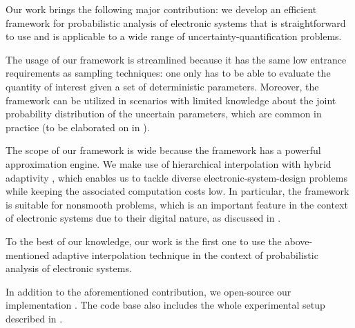 Our work brings the following major contribution: we develop an efficient
framework for probabilistic analysis of electronic systems that is
straightforward to use and is applicable to a wide range of
uncertainty-quantification problems.

The usage of our framework is streamlined because it has the same low entrance
requirements as sampling techniques: one only has to be able to evaluate the
quantity of interest given a set of deterministic parameters. Moreover, the
framework can be utilized in scenarios with limited knowledge about the joint
probability distribution of the uncertain parameters, which are common in
practice (to be elaborated on in ).

The scope of our framework is wide because the framework has a powerful
approximation engine. We make use of hierarchical interpolation with hybrid
adaptivity \cite{jakeman2012, klimke2006, ma2009}, which enables us to tackle
diverse electronic-system-design problems while keeping the associated
computation costs low. In particular, the framework is suitable for nonsmooth
problems, which is an important feature in the context of electronic systems due
to their digital nature, as discussed in .

To the best of our knowledge, our work is the first one to use the
above-mentioned adaptive interpolation technique in the context of probabilistic
analysis of electronic systems.

In addition to the aforementioned contribution, we open-source our
implementation \cite{sources}. The code base also includes the whole
experimental setup described in .
